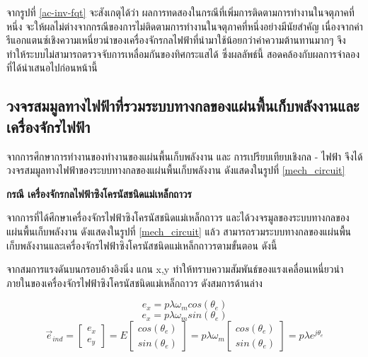 \documentclass[11pt,a4paper]{article}
\begin{document}
จากรูปที่ \ref{ac-inv-fqt} จะสังเกตุได้ว่า ผลการทดสองในกรณีที่เพิ่มการติดตามการทำงานในจตุภาคที่หนึ่ง จะให้ผลไม่ต่างจากกรณีของการไม่ติดตามการทำงานในจตุภาคที่หนึ่งอย่างมีนัยสำคัญ เนื่องจากค่ารีแอกแตนซ์เชิงความเหนี่ยวนำของเครื่องจักรกลไฟฟ้าที่นำมาใช้น้อยกว่าค่าความต้านทานมากๆ จึงทำให้ระบบไม่สามารถตรวจจับการเหลื่อมกันของทิศกระแสได้ ซึ่งผลลัพธ์นี้ สอดคล้องกับผลการจำลองที่ได้นำเสนอไปก่อนหน้านี้

\subsection{วงจรสมมูลทางไฟฟ้าที่รวมระบบทางกลของแผ่นพื้นเก็บพลังงานและเครื่องจักรไฟฟ้า}
จากการศึกษาการทำงานของทำงานของแผ่นพื้นเก็บพลังงาน และ การเปรียบเทียบเชิงกล - ไฟฟ้า จึงได้วงจรสมมูลทางไฟฟ้าของระบบทางกลของแผ่นพื้นเก็บพลังงาน ดังแสดงในรูปที่ \ref{mech_circuit}

\textbf{กรณี เครื่องจักรกลไฟฟ้าซิงโครนัสชนิดแม่เหล็กถาวร}

จากการที่ได้ศึกษาเครื่องจักรไฟฟ้าซิงโครนัสชนิดแม่เหล็กถาวร และได้วงจรมูลของระบบทางกลของแผ่นพื้นเก็บพลังงาน ดังแสดงในรูปที่ \ref{mech_circuit} แล้ว สามารถรวมระบบทางกลของแผ่นพื้นเก็บพลังงานและเครื่องจักรไฟฟ้าซิงโครนัสชนิดแม่เหล็กถาวรตามขั้นตอน ดังนี้

จากสมการแรงดันบนกรอบอ้างอิงนิ่ง แกน x,y ทำให้ทราบความสัมพันธ์ของแรงเคลื่อนเหนี่ยวนำภายในของเครื่องจักรไฟฟ้าซิงโครนัสชนิดแม่เหล็กถาวร ดังสมการด้านล่าง

\begin{equation}
    e_{x} = p \lambda \omega_{m} cos(\theta_{e})
\end{equation}
\begin{equation}
    e_{x} = p \lambda \omega_{m} sin(\theta_{e})
\end{equation}
\begin{equation}
    \vec{e}_{ind} =
    \begin{bmatrix}
        e_{x} \\ e_{y}
    \end{bmatrix} = E
    \begin{bmatrix}
        cos(\theta_{e}) \\ sin(\theta_{e})
    \end{bmatrix} = p \lambda \omega_{m}
    \begin{bmatrix}
        cos(\theta_{e}) \\ sin(\theta_{e})
    \end{bmatrix} =
    p \lambda e^{j\theta_{e}}
\end{equation}
\end{document}
